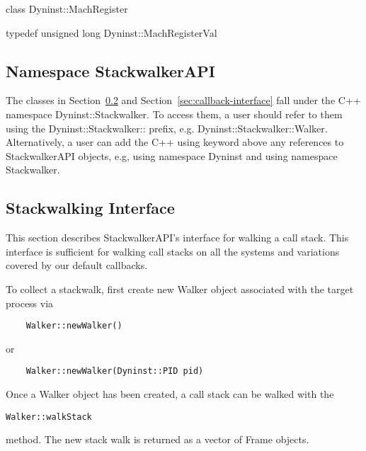 \begin{apient}
class Dyninst::MachRegister
\end{apient}

\begin{apient}
typedef unsigned long Dyninst::MachRegisterVal
\end{apient}
    
\subsection{Namespace StackwalkerAPI}
The classes in Section~\ref{sec:stackwalking-interface} and
Section~\ref{sec:callback-interface} fall under the C++ namespace
Dyninst::Stackwalker. To access them, a user should refer to them using the
Dyninst::Stackwalker:: prefix, e.g. Dyninst::Stackwalker::Walker. Alternatively,
a user can add the C++ using keyword above any references to StackwalkerAPI
objects, e.g, using namespace Dyninst and using namespace Stackwalker.
    
\subsection{Stackwalking Interface}
\label{sec:stackwalking-interface}

This section describes StackwalkerAPI's interface for walking a call stack. This
interface is sufficient for walking call stacks on all the systems and
variations covered by our default callbacks. 

To collect a stackwalk, first create new Walker object associated with the target process via

\begin{lstlisting}
    Walker::newWalker()
\end{lstlisting}
	or 
\begin{lstlisting}
    Walker::newWalker(Dyninst::PID pid)
\end{lstlisting}

Once a Walker object has been created, a call stack can be walked with the
\begin{lstlisting}
Walker::walkStack
\end{lstlisting}
method. The new stack walk is returned as a vector of Frame objects.
    
